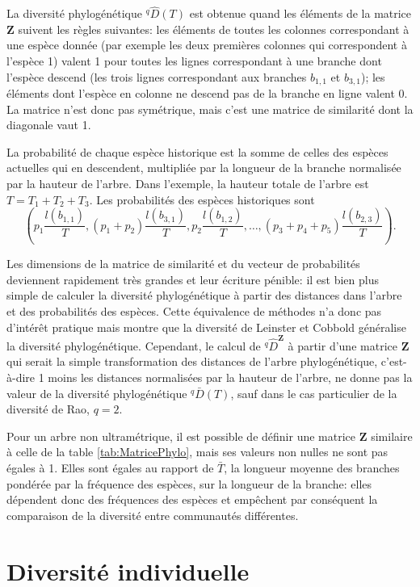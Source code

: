 \documentclass[
  11pt,
  french,
  a4paper,
  extrafontsizes,onecolumn,openright
  ]{memoir}
\begin{document}
La diversité phylogénétique \(^{q}\!\hat{D}(T)\) est obtenue quand les éléments de la matrice \(\mathbf{Z}\) suivent les règles suivantes: les éléments de toutes les colonnes correspondant à une espèce donnée (par exemple les deux premières colonnes qui correspondent à l'espèce 1) valent 1 pour toutes les lignes correspondant à une branche dont l'espèce descend (les trois lignes correspondant aux branches \(b_{1,1}\) et \(b_{3,1}\)); les éléments dont l'espèce en colonne ne descend pas de la branche en ligne valent 0.
La matrice n'est donc pas symétrique, mais c'est une matrice de similarité dont la diagonale vaut 1.

La probabilité de chaque espèce historique est la somme de celles des espèces actuelles qui en descendent, multipliée par la longueur de la branche normalisée par la hauteur de l'arbre.
Dans l'exemple, la hauteur totale de l'arbre est \(T=T_1 + T_2 + T_3\).
Les probabilités des espèces historiques sont
\[(p_1 \frac{l(b_{1,1})}{T}, (p_1 + p_2) \frac{l(b_{3,1})}{T}, p_2 \frac{l(b_{1,2})}{T}, \dots, (p_3 + p_4 + p_5) \frac{l(b_{2,3})}{T}).\]

Les dimensions de la matrice de similarité et du vecteur de probabilités deviennent rapidement très grandes et leur écriture pénible: il est bien plus simple de calculer la diversité phylogénétique à partir des distances dans l'arbre et des probabilités des espèces.
Cette équivalence de méthodes n'a donc pas d'intérêt pratique mais montre que la diversité de Leinster et Cobbold généralise la diversité phylogénétique.
Cependant, le calcul de \(^q\!{\hat{D}}^{\mathbf{Z}}\) à partir d'une matrice \(\mathbf{Z}\) qui serait la simple transformation des distances de l'arbre phylogénétique, c'est-à-dire 1 moins les distances normalisées par la hauteur de l'arbre, ne donne pas la valeur de la diversité phylogénétique \(^{q}\!\bar{D}(T)\), sauf dans le cas particulier de la diversité de Rao, \(q=2\).

Pour un arbre non ultramétrique, il est possible de définir une matrice \(\mathbf{Z}\) similaire à celle de la table \ref{tab:MatricePhylo}, mais ses valeurs non nulles ne sont pas égales à 1.
Elles sont égales au rapport de \(\bar{T}\), la longueur moyenne des branches pondérée par la fréquence des espèces, sur la longueur de la branche: elles dépendent donc des fréquences des espèces et empêchent par conséquent la comparaison de la diversité entre communautés différentes.

\section{Diversité individuelle}\label{diversituxe9-individuelle-1}
\end{document}
